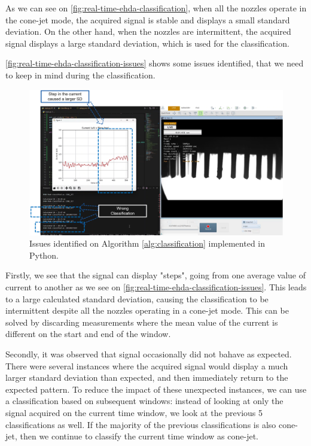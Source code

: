 \documentclass[oneside,12pt]{article}
\begin{document}
As we can see on \autoref{fig:real-time-ehda-classification}, when all the nozzles operate in
the cone-jet mode, the acquired signal is stable and displays a small standard deviation.
On the other hand, when the nozzles are intermittent, the acquired signal displays a 
large standard deviation, which is used for the classification.

\autoref{fig:real-time-ehda-classification-issues} shows some issues identified, that we need to keep 
in mind during the classification.

\begin{figure}[h!]
    \centering
    \includegraphics[width=\textwidth,trim=1 1 1 1,clip]{figures/real-time-ehda-classification-issues.png}
    \caption{Issues identified on Algorithm \ref{alg:classification} implemented in Python.}
    \label{fig:real-time-ehda-classification-issues}
\end{figure}

Firstly, we see that the signal can display "steps", going from one average value of current to another 
as we see on \autoref{fig:real-time-ehda-classification-issues}. This leads to a large calculated standard 
deviation, causing the classification to be intermittent despite all the nozzles operating in a
cone-jet mode. This can be solved by discarding measurements where the mean value of the current 
is different on the start and end of the window.

Secondly, it was observed that signal occasionally did not bahave as expected. There were several instances 
where the acquired signal would display a much larger standard deviation than expected, and then immediately 
return to the expected pattern. To reduce the impact of these unexpected instances, we can use a classification 
based on subsequent windows: instead of looking at only the signal acquired on the current time window, 
we look at the previous 5 classifications as well. If the majority of the previous classifications is also cone-jet,
then we continue to classify the current time window as cone-jet.
\end{document}
